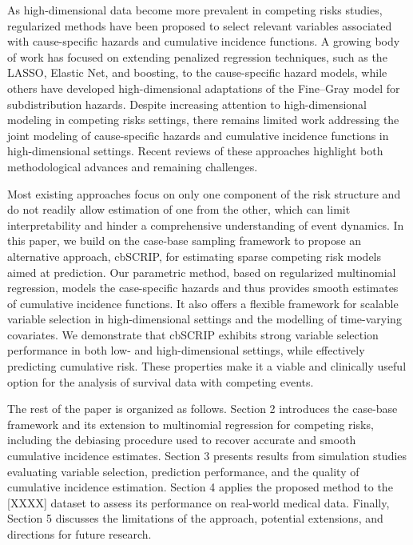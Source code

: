 \documentclass[AMA,Times1COL]{WileyNJDv5} %
\begin{document}
As high-dimensional data become more prevalent in competing risks studies, regularized methods have been proposed to select relevant variables associated with cause-specific hazards and cumulative incidence functions. A growing body of work has focused on extending penalized regression techniques, such as the LASSO, Elastic Net, and boosting, to the cause-specific hazard models,\cite{SaadatiBeyersmannKopp-Schneider:2018, HouParavatiHou:2018} while others have developed high-dimensional adaptations of the Fine–Gray model for subdistribution hazards.\cite{BinderAllignolSchumacher:2009, HouBradicXu:2019} Despite increasing attention to high-dimensional modeling in competing risks settings, there remains limited work addressing the joint modeling of cause-specific hazards and cumulative incidence functions in high-dimensional settings. Recent reviews of these approaches highlight both methodological advances and remaining challenges.\cite{Monterrubio-GomezConstantine-CookeVallejos:2024, HouXu:2018} 

Most existing approaches focus on only one component of the risk structure and do not readily allow estimation of one from the other, which can limit interpretability and hinder a comprehensive understanding of event dynamics. In this paper, we build on the case-base sampling framework to propose an alternative approach, cbSCRIP, for estimating sparse competing risk models aimed at prediction. Our parametric method, based on regularized multinomial regression, models the case-specific hazards and thus provides smooth estimates of cumulative incidence functions. It also offers a flexible framework for scalable variable selection in high-dimensional settings and the modelling of time-varying covariates. We demonstrate that cbSCRIP exhibits strong variable selection performance in both low- and high-dimensional settings, while effectively predicting cumulative risk. These properties make it a viable and clinically useful option for the analysis of survival data with competing events.

The rest of the paper is organized as follows. Section 2 introduces the case-base framework and its extension to multinomial regression for competing risks, including the debiasing procedure used to recover accurate and smooth cumulative incidence estimates. Section 3 presents results from simulation studies evaluating variable selection, prediction performance, and the quality of cumulative incidence estimation. Section 4 applies the proposed method to the [XXXX] dataset to assess its performance on real-world medical data. Finally, Section 5 discusses the limitations of the approach, potential extensions, and directions for future research.
\end{document}
